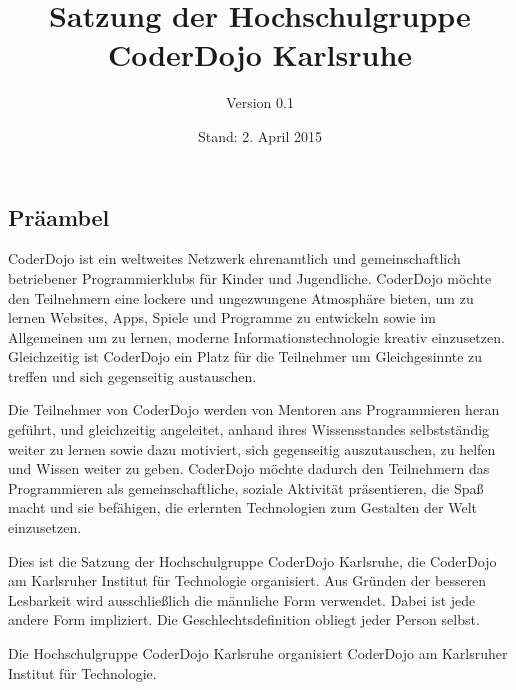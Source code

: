 \documentclass[a4paper, parskip=half, numbers=noenddot]{scrartcl}
\title{Satzung der Hochschulgruppe\\CoderDojo Karlsruhe}
\author{Version 0.1}
\date{Stand: 2. April 2015}
\begin{document}
%
%

\maketitle
\thispagestyle{empty}

\pagestyle{empty}
\newpage
\rule{0mm}{0mm}
\newpage


\begin{contract}

\setcounter{page}{1}
\pagestyle{plain}


%
%

\tableofcontents
\newpage


%
%

\section*{Präambel}

CoderDojo ist ein weltweites Netzwerk ehrenamtlich und gemeinschaftlich
betriebener Programmierklubs für Kinder und Jugendliche.
CoderDojo möchte den Teilnehmern eine lockere und ungezwungene Atmosphäre
bieten, um zu lernen Websites, Apps, Spiele und Programme zu entwickeln sowie im
Allgemeinen um zu lernen, moderne Informationstechnologie kreativ einzusetzen.
Gleichzeitig ist CoderDojo ein Platz für die Teilnehmer um Gleichgesinnte zu
treffen und sich gegenseitig austauschen.

Die Teilnehmer von CoderDojo werden von Mentoren ans Programmieren heran geführt,
und gleichzeitig angeleitet, anhand ihres Wissensstandes selbstständig weiter zu
lernen sowie dazu motiviert, sich gegenseitig auszutauschen, zu helfen und Wissen
weiter zu geben.
CoderDojo möchte dadurch den Teilnehmern das Programmieren als gemeinschaftliche,
soziale Aktivität präsentieren, die Spaß macht und sie befähigen, die erlernten
Technologien zum Gestalten der Welt einzusetzen.

Dies ist die Satzung der Hochschulgruppe CoderDojo Karlsruhe, die CoderDojo
am Karlsruher Institut für Technologie organisiert.
Aus Gründen der besseren Lesbarkeit wird ausschließlich die männliche Form verwendet.
Dabei ist jede andere Form impliziert.
Die Geschlechtsdefinition obliegt jeder Person selbst.


%
%


Die Hochschulgruppe CoderDojo Karlsruhe organisiert CoderDojo am Karlsruher
Institut für Technologie.


\end{contract}
\end{document}
